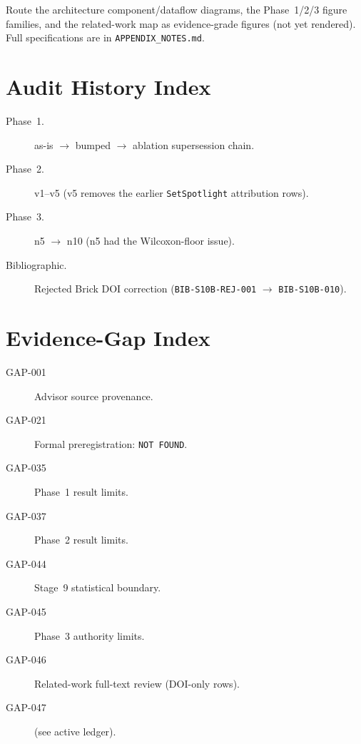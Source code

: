 \documentclass[12pt, a4paper, oneside]{memoir}
\begin{document}
Route the architecture component/dataflow diagrams, the Phase~1/2/3 figure
families, and the related-work map as evidence-grade figures (not yet
rendered).  Full specifications are in \texttt{APPENDIX\_NOTES.md}.

\chapter{Audit History Index}
\label{app:audit}

\begin{description}
  \item[Phase~1.] as-is $\to$ bumped $\to$ ablation supersession chain.
  \item[Phase~2.] v1--v5 (v5 removes the earlier \texttt{SetSpotlight}
        attribution rows).
  \item[Phase~3.] n5 $\to$ n10 (n5 had the Wilcoxon-floor issue).
  \item[Bibliographic.] Rejected Brick DOI correction
        (\texttt{BIB-S10B-REJ-001} $\to$ \texttt{BIB-S10B-010}).
\end{description}

\chapter{Evidence-Gap Index}
\label{app:gaps}

\begin{description}
  \item[GAP-001] Advisor source provenance.
  \item[GAP-021] Formal preregistration: \texttt{NOT FOUND}.
  \item[GAP-035] Phase~1 result limits.
  \item[GAP-037] Phase~2 result limits.
  \item[GAP-044] Stage~9 statistical boundary.
  \item[GAP-045] Phase~3 authority limits.
  \item[GAP-046] Related-work full-text review (DOI-only rows).
  \item[GAP-047] (see active ledger).
\end{description}

\end{document}
